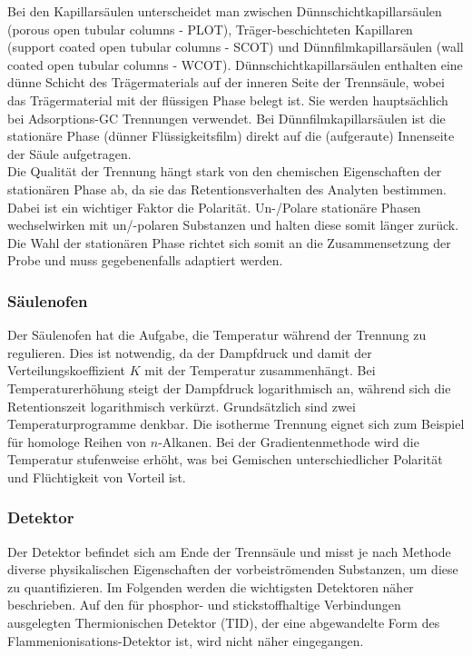       Bei den Kapillarsäulen unterscheidet man zwischen Dünnschichtkapillarsäulen (porous open tubular columns - PLOT), Träger-beschichteten Kapillaren (support coated open tubular columns - SCOT) und Dünnfilmkapillarsäulen (wall coated open tubular columns - WCOT). Dünnschichtkapillarsäulen enthalten eine dünne Schicht des Trägermaterials auf der inneren Seite der Trennsäule, wobei das Trägermaterial mit der flüssigen Phase belegt ist. Sie werden hauptsächlich bei Adsorptions-GC Trennungen verwendet. Bei Dünnfilmkapillarsäulen ist die stationäre Phase (dünner Flüssigkeitsfilm) direkt auf die (aufgeraute) Innenseite der Säule aufgetragen. \citep[S. 164-166]{Taschenatlas} \\
      
      Die Qualität der Trennung hängt stark von den chemischen Eigenschaften der stationären Phase ab, da sie das Retentionsverhalten des Analyten bestimmen. Dabei ist ein wichtiger Faktor die Polarität. Un-/Polare stationäre Phasen wechselwirken mit un/-polaren Substanzen und halten diese somit länger zurück. Die Wahl der stationären Phase richtet sich somit an die Zusammensetzung der Probe und muss gegebenenfalls adaptiert werden. \citep{Versuchsvorschrift}
      
    \subsubsection{Säulenofen}
      
      Der Säulenofen hat die Aufgabe, die Temperatur während der Trennung zu regulieren. Dies ist notwendig, da der Dampfdruck und damit der Verteilungskoeffizient $K$ mit der Temperatur zusammenhängt. Bei Temperaturerhöhung steigt der Dampfdruck logarithmisch an, während sich die Retentionszeit logarithmisch verkürzt. Grundsätzlich sind zwei Temperaturprogramme denkbar. Die isotherme Trennung eignet sich zum Beispiel für homologe Reihen von $n$-Alkanen. Bei der Gradientenmethode wird die Temperatur stufenweise erhöht, was bei Gemischen unterschiedlicher Polarität und Flüchtigkeit von Vorteil ist. \citep[S. 168]{Taschenatlas}   
    
    \subsubsection{Detektor}
    
      Der Detektor befindet sich am Ende der Trennsäule und misst je nach Methode diverse physikalischen Eigenschaften der vorbeiströmenden Substanzen, um diese zu quantifizieren. Im Folgenden werden die wichtigsten Detektoren näher beschrieben. Auf den für phosphor- und stickstoffhaltige Verbindungen ausgelegten Thermionischen Detektor (TID), der eine abgewandelte Form des Flammenionisations-Detektor ist, wird nicht näher eingegangen.
      
